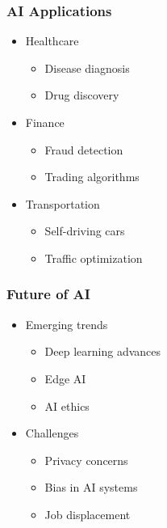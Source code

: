 \documentclass{beamer}
\begin{document}
\begin{frame}
\frametitle{AI Applications}
\begin{itemize}
    \item Healthcare
    \begin{itemize}
        \item Disease diagnosis
        \item Drug discovery
    \end{itemize}
    \item Finance
    \begin{itemize}
        \item Fraud detection
        \item Trading algorithms
    \end{itemize}
    \item Transportation
    \begin{itemize}
        \item Self-driving cars
        \item Traffic optimization
    \end{itemize}
\end{itemize}
\end{frame}

\begin{frame}
\frametitle{Future of AI}
\begin{itemize}
    \item Emerging trends
    \begin{itemize}
        \item Deep learning advances
        \item Edge AI
        \item AI ethics
    \end{itemize}
    \item Challenges
    \begin{itemize}
        \item Privacy concerns
        \item Bias in AI systems
        \item Job displacement
    \end{itemize}
\end{itemize}
\end{frame}
\end{document}
